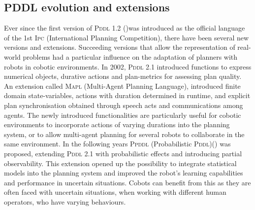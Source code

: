 


\subsection{PDDL evolution and extensions}\label{subsec:PDDL evolution}

Ever since the first version of \textsc{Pddl} 1.2 (\cite{mcdermott1998pddl})was introduced as the official language of the 1st \textsc{Ipc} (International Planning Competition), there have been several new versions and extensions. 
Succeeding versions that allow the representation of real-world problems had a particular influence on the adaptation of planners with robots in cobotic environments. In 2002, \textsc{Pddl} 2.1 introduced functions to express numerical objects, durative actions and plan-metrics for assessing plan quality. 
An extension called \textsc{Mapl} (Multi-Agent Planning Language), introduced finite domain state-variables, actions with duration determined in runtime, and explicit plan synchronisation obtained through speech acts and communications among agents. 
The newly introduced functionalities are particularly useful for cobotic environments to incorporate actions of varying durations into the planning system, or to allow multi-agent planning for several robots to collaborate in the same environment.
In the following years \textsc{Ppddl} (Probabilistic \textsc{Pddl})(\cite{younes:04a}) was proposed, extending \textsc{Pddl} 2.1 with probabilistic effects and introducing partial observability. This extension opened up the possibility to integrate statistical models into the planning system and improved the robot's learning capabilities and performance in uncertain situations. Cobots can benefit from this as they are often faced with uncertain situations, when working with different human operators, who have varying behaviours.


